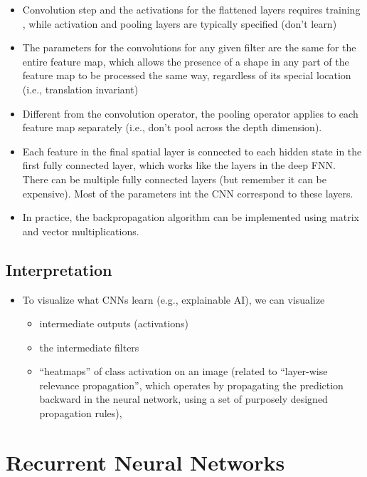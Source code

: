 \documentclass[
]{book}
\begin{document}
\begin{itemize}
\item
  Convolution step and the activations for the flattened layers requires training , while activation and pooling layers are typically specified (don't learn)
\item
  The parameters for the convolutions for any given filter are the same for the entire feature map, which allows the presence of a shape in any part of the feature map to be processed the same way, regardless of its special location (i.e., translation invariant)
\item
  Different from the convolution operator, the pooling operator applies to each feature map separately (i.e., don't pool across the depth dimension).
\item
  Each feature in the final spatial layer is connected to each hidden state in the first fully connected layer, which works like the layers in the deep FNN. There can be multiple fully connected layers (but remember it can be expensive). Most of the parameters int the CNN correspond to these layers.
\item
  In practice, the backpropagation algorithm can be implemented using matrix and vector multiplications.
\end{itemize}

\hypertarget{interpretation}{%
\subsection{Interpretation}\label{interpretation}}

\begin{itemize}
\item
  To visualize what CNNs learn (e.g., explainable AI), we can visualize

  \begin{itemize}
  \item
    intermediate outputs (activations)
  \item
    the intermediate filters
  \item
    ``heatmaps'' of class activation on an image (related to ``layer-wise relevance propagation'', which operates by propagating the prediction backward in the neural network, using a set of purposely designed propagation rules),
  \end{itemize}
\end{itemize}

\hypertarget{recurrent-neural-networks}{%
\section{Recurrent Neural Networks}\label{recurrent-neural-networks}}
\end{document}
